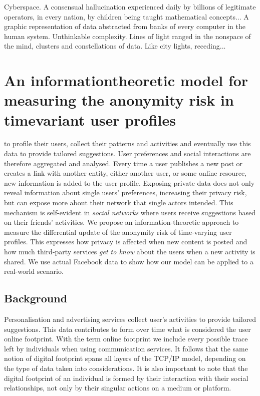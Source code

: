 \begin{savequote}[75mm]
Cyberspace. A consensual hallucination experienced daily by billions of legitimate operators, in every nation, by children being taught mathematical concepts... A graphic representation of data abstracted from banks of every computer in the human system. Unthinkable complexity. Lines of light ranged in the nonspace of the mind, clusters and constellations of data. Like city lights, receding...
\end{savequote}

\chapter{An information\hyph theoretic model for measuring the anonymity risk in time\hyph variant user profiles}

 to profile their users, collect their patterns and activities and eventually use this data to provide tailored suggestions. User preferences and social interactions are therefore aggregated and analysed. Every time a user publishes a new post or creates a link with another entity, either another user, or some online resource, new information is added to the user profile. Exposing private data does not only reveal information about single users' preferences, increasing their privacy risk, but can expose more about their network that single actors intended. This mechanism is self-evident in \emph{social networks} where users receive suggestions based on their friends' activities.
We propose an information-theoretic approach to measure the differential update of the anonymity risk of time-varying user profiles. This expresses how privacy is affected when new content is posted and how much third-party services \emph{get to know} about the users when a new activity is shared. We use actual Facebook data to show how our model can be applied to a real-world scenario.

\section{Background}
\noindent
Personalisation and advertising services collect user's activities to provide tailored suggestions. This data contributes to form over time what is considered the user online footprint. With the term online footprint we include every possible trace left by individuals when using communication services. It follows that the same notion of digital footprint spans all layers of the TCP/IP model, depending on the type of data taken into considerations. It is also important to note that the digital footprint of an individual is formed by their interaction with their social relationships, not only by their singular actions on a medium or platform. 


